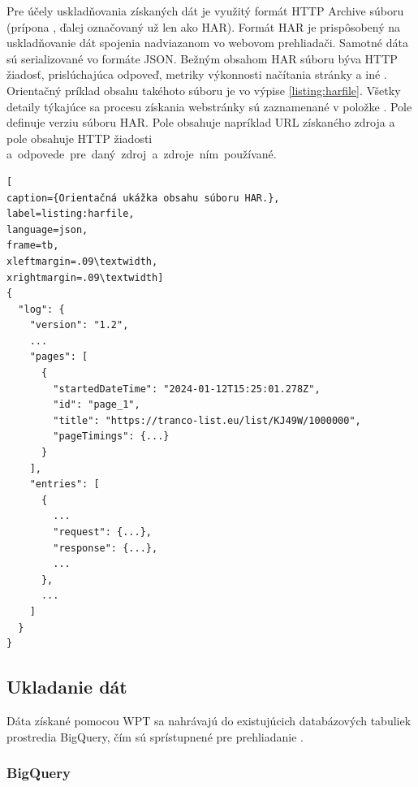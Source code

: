 Pre účely uskladňovania získaných dát je využitý formát HTTP Archive súboru (prípona , ďalej označovaný už len ako HAR).
Formát HAR je prispôsobený na uskladňovanie dát spojenia nadviazanom vo webovom prehliadači. Samotné dáta sú serializované vo formáte JSON.
Bežným obsahom HAR súboru býva HTTP žiadosť, prislúchajúca odpoveď, metriky výkonnosti načítania stránky a iné \cite{httparchive-harfile}. 
Orientačný príklad obsahu takéhoto súboru je vo výpise \ref{listing:harfile}.
Všetky detaily týkajúce sa procesu získania webstránky sú zaznamenané v položke . Pole  definuje verziu súboru HAR. Pole  obsahuje napríklad URL získaného zdroja a pole  obsahuje HTTP žiadosti \mbox{a odpovede pre daný zdroj a zdroje ním používané.}

\begin{center}
\centering
\begin{lstlisting}[
caption={Orientačná ukážka obsahu súboru HAR.},
label=listing:harfile, 
language=json, 
frame=tb,
xleftmargin=.09\textwidth, 
xrightmargin=.09\textwidth]
{
  "log": {
    "version": "1.2",
    ...
    "pages": [
      {
        "startedDateTime": "2024-01-12T15:25:01.278Z",
        "id": "page_1",
        "title": "https://tranco-list.eu/list/KJ49W/1000000",
        "pageTimings": {...}
      }
    ],
    "entries": [
      {
        ...
        "request": {...},
        "response": {...},
        ...
      },
      ...
    ]
  }
}
\end{lstlisting}
\end{center} 

\subsection{Ukladanie dát}
\label{httparchive-data-storage}

Dáta získané pomocou WPT sa nahrávajú do existujúcich databázových tabuliek prostredia BigQuery, čím sú sprístupnené pre prehliadanie \cite{httparchive-faq}.

\subsubsection{BigQuery}
\label{big-query}

